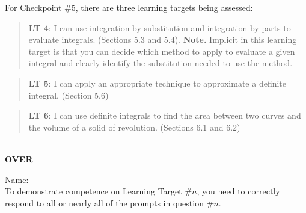 \documentclass[11 pt]{article}
\begin{document}
 For Checkpoint \#5, there are three learning targets being assessed: 

\begin{quote}
{\bf LT 4}: I can use integration by substitution and integration by parts to evaluate integrals. (Sections 5.3 and 5.4). {\bf Note.} Implicit in this learning target is that you can decide which method to apply to evaluate a given integral and clearly identify the substitution needed to use the method.
\end{quote}

\begin{quote}
{\bf LT 5}: I can apply an appropriate technique to approximate a definite integral. (Section 5.6)
\end{quote}

\begin{quote}
{\bf LT 6}: I can use definite integrals to find the area between two curves and the volume of a solid of revolution. (Sections 6.1 and 6.2)
\end{quote}

\noindent \hrulefill \\

\vfill \hfill {\bf OVER} 

\pagebreak

\noindent Name: \\ 

\noindent To demonstrate competence on Learning Target \#$n$, you need to correctly respond to all or nearly all of the prompts in question \#$n$.  
\end{document}
